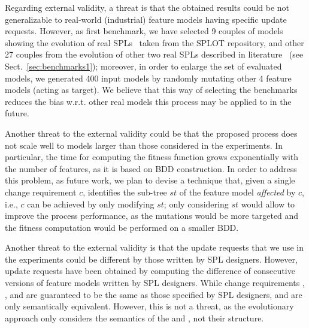 \begin{tikzborder}{\cite{Gargantini16:validation}}
\begin{tikzborder}{\cite{gargantini_combinatorial_2017}}
\begin{tikzborder}{\cite{garn2019}}
\begin{tikzborder}{\cite{arcaini2019achieving}}
	\bb Regarding external validity, a threat is that the obtained results could be not generalizable to real-world (industrial) feature models having specific update requests. However, as first benchmark, we have selected 9 couples of models showing the evolution of real SPLs~\cite{multimediaPaper,helpSystemPaper,smartHomePaper} taken from the SPLOT repository, and other 27 couples from the evolution of other two real SPLs described in literature~\cite{Burdek2016,Pleuss2012} (see Sect.~\ref{sec:benchmarks1}); moreover, in order to enlarge the set of evaluated models, we generated 400 input models by randomly mutating other 4 feature models (acting as target). We believe that this way of selecting the benchmarks reduces the bias w.r.t. other real models this process may be applied to in the future.
	
	Another threat to the external validity could be that the proposed process does not scale well to models larger than those considered in the experiments. In particular, the time for computing the fitness function grows exponentially with the number of features, as it is based on BDD construction. In order to address this problem, as future work, we plan to devise a technique that, given a single change requirement $c$, identifies the sub-tree $\mathit{st}$ of the feature model {\it affected} by $c$, i.e., $c$ can be achieved by only modifying $\mathit{st}$; only considering $\mathit{st}$ would allow to improve the process performance, as the mutations would be more targeted and the fitness computation would be performed on a smaller BDD.
	
	Another threat to the external validity is that the update requests that we use in the experiments could be different by those written by SPL designers. However, update requests have been obtained by computing the difference of consecutive versions of feature models written by SPL designers. While change requirements \Ftbr, \Fadd, and \Frem are guaranteed to be the same as those specified by SPL designers, \CFrelax and \CFrem are only semantically equivalent. However, this is not a threat, as the evolutionary approach only considers the semantics of the \CFrelax and \CFrem, not their structure.\be
	

\end{tikzborder}
\end{tikzborder}
\end{tikzborder}
\end{tikzborder}

